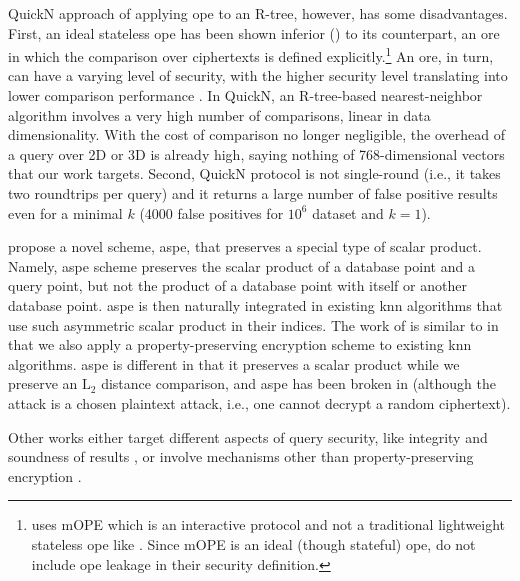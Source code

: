 		QuickN approach of applying \acrshort{ope} to an R-tree, however, has some disadvantages.
		First, an ideal stateless \acrshort{ope} has been shown inferior (\cite{ope-leakage}) to its counterpart, an \acrfull{ore} in which the comparison over ciphertexts is defined explicitly.\footnote{
			\cite{quick-n} uses mOPE \cite{ope-ideal-security-protocol} which is an interactive protocol and not a traditional lightweight stateless \acrshort{ope} like \cite{bclo-ope}.
			Since mOPE is an ideal (though stateful) \acrshort{ope}, \textcite{quick-n} do not include \acrshort{ope} leakage in their security definition.
		}
		An \acrshort{ore}, in turn, can have a varying level of security, with the higher security level translating into lower comparison performance \cite{ore-benchmark-17}.
		In QuickN, an R-tree-based nearest-neighbor algorithm involves a very high number of comparisons, linear in data dimensionality.
		With the cost of comparison no longer negligible, the overhead of a query over 2D or 3D is already high, saying nothing of 768-dimensional vectors that our work targets.
		Second, QuickN protocol is not single-round (i.e., it takes two roundtrips per query) and it returns a large number of false positive results even for a minimal $k$ (\num{4000} false positives for $10^6$ dataset and $k = 1$).

		\textcite{knn-aspe} propose a novel scheme, \acrshort{aspe}, that preserves a special type of scalar product.
		Namely, \acrfull{aspe} scheme preserves the scalar product of a database point and a query point, but not the product of a database point with itself or another database point.
		\acrshort{aspe} is then naturally integrated in existing \acrshort{knn} algorithms that use such asymmetric scalar product in their indices.
		The work of \textcite{knn-aspe} is similar to \kanon{} in that we also apply a property-preserving encryption scheme to existing \acrshort{knn} algorithms.
		\acrshort{aspe} is different in that it preserves a scalar product while we preserve an $\text{L}_2$ distance comparison, and \acrshort{aspe} has been broken in \cite{secure-nn-revisited-break-aspe} (although the attack is a chosen plaintext attack, i.e., one cannot decrypt a random ciphertext).

		Other works either target different aspects of query security, like integrity and soundness of results \cite{knn-integrity-soundness,svknn}, or involve mechanisms other than property-preserving encryption \cite{seceqp,practical-approx-knn,knn-sharing-keys,knn-mult-data-owners,knn-over-encrypted,knn-paillier,knn-blind,knn-homomorphism,knn-strong-location-privacy,knn-no-anonymizers,knn-efficient,knn-new-casper}.
